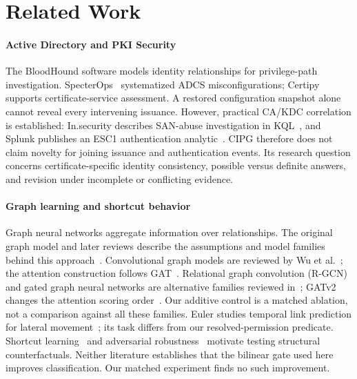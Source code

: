 \section{Related Work}
\label{sec:related_conclusion}


\paragraph{Active Directory and PKI Security}
The BloodHound software models identity relationships for privilege-path investigation. SpecterOps~\cite{schroeder2021certified} systematized ADCS misconfigurations; Certipy~\cite{lyak2021certipy} supports certificate-service assessment. A restored configuration snapshot alone cannot reveal every intervening issuance. However, practical CA/KDC correlation is established: In.security describes SAN-abuse investigation in KQL~\cite{insecurity2023adcs}, and Splunk publishes an ESC1 authentication analytic~\cite{splunk2026esc1}. CIPG therefore does not claim novelty for joining issuance and authentication events. Its research question concerns certificate-specific identity consistency, possible versus definite answers, and revision under incomplete or conflicting evidence.

\paragraph{Graph learning and shortcut behavior}
Graph neural networks aggregate information over relationships. The original graph model and later reviews describe the assumptions and model families behind this approach~\cite{scarselli2008graph,wu2021survey,zhou2020review}. Convolutional graph models are reviewed by Wu et al.~\cite{wu2021survey}; the attention construction follows GAT~\cite{velickovic2018graph}. Relational graph convolution (R-GCN) and gated graph neural networks are alternative families reviewed in~\cite{wu2021survey,zhou2020review}; GATv2 changes the attention scoring order~\cite{brody2022attentive}. Our additive control is a matched ablation, not a comparison against all these families. Euler studies temporal link prediction for lateral movement~\cite{king2023euler}; its task differs from our resolved-permission predicate. Shortcut learning~\cite{geirhos2020shortcut} and adversarial robustness~\cite{wu2025understanding} motivate testing structural counterfactuals. Neither literature establishes that the bilinear gate used here improves classification. Our matched experiment finds no such improvement.

